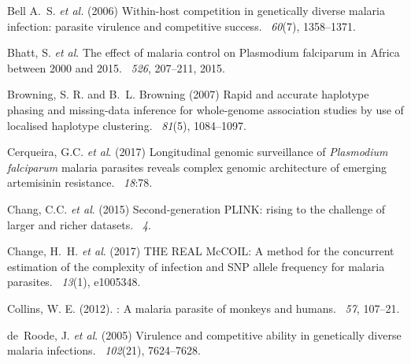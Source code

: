 \documentclass[9pt,lineno]{elife}
\begin{document}
\begin{thebibliography}{}

Bell A.~S. {\em et al.} (2006)
\newblock Within-host competition in genetically diverse malaria infection: parasite virulence and competitive success.
~{\em 60}(7), 1358--1371.

Bhatt, S. {\em et al}.
\newblock The effect of malaria control on Plasmodium falciparum in Africa between 2000 and 2015.
~{\em 526}, 207--211, 2015.

Browning, S. R. and B.~L. Browning (2007)
\newblock Rapid and accurate haplotype phasing and missing-data inference for
  whole-genome association studies by use of localised haplotype clustering.
~{\em 81\/}(5), 1084--1097.

Cerqueira, G.C. {\em et al}. (2017)
\newblock Longitudinal genomic surveillance of {\em Plasmodium falciparum} malaria parasites reveals complex genomic architecture of emerging artemisinin resistance.
~{\em 18}:78.


Chang, C.C. {\em et al}. (2015)
\newblock Second-generation PLINK: rising to the challenge of larger and richer datasets.
~{\em 4}.

Change, H.~H. {\em et al}. (2017)
\newblock THE REAL McCOIL: A method for the concurrent estimation of the complexity of infection and SNP allele frequency for malaria parasites.
~{\em 13\/}(1), e1005348.

Collins, W. E. (2012).
: A malaria parasite of monkeys and humans.
~{\em 57\/}, 107--21.


de~Roode, J. {\em et al}. (2005)
\newblock Virulence and competitive ability in genetically diverse malaria infections.
~{\em 102\/}(21), 7624--7628.



\end{thebibliography}
\end{document}
